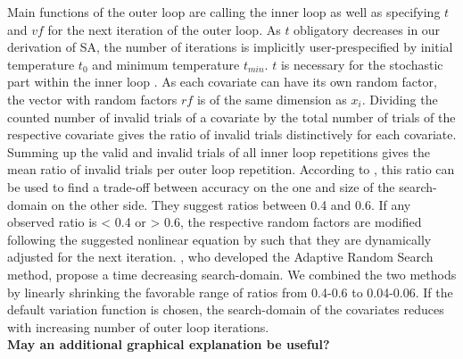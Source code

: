 Main functions of the outer loop are calling the inner loop as well as specifying $t$ and $vf$ for the next iteration of the outer loop. As $t$ obligatory decreases in our derivation of SA, the number of iterations is implicitly user-prespecified by initial temperature $t_0$ and minimum temperature $t_{min}$. $t$ is necessary for the stochastic part within the inner loop \citep{kirkpatrick_1983}. As each covariate can have its own random factor, the vector with random factors $rf$ is of the same dimension as $x_i$. Dividing the counted number of invalid trials of a covariate by the total number of trials of the respective covariate gives the ratio of invalid trials distinctively for each covariate. Summing up the valid and invalid trials of all inner loop repetitions gives the mean ratio of invalid trials per outer loop repetition. According to \citep{corana_1987}, this ratio can be used to find a trade-off between accuracy on the one and size of the search-domain on the other side. They suggest ratios between 0.4 and 0.6. If any observed ratio is < 0.4 or > 0.6, the respective random factors are modified following the suggested nonlinear equation by \citet{corana_1987} such that they are dynamically adjusted for the next iteration. \citet{pronzato_1984}, who developed the Adaptive Random Search method, propose a time decreasing search-domain. We combined the two methods by linearly shrinking the favorable range of ratios from 0.4-0.6 to 0.04-0.06. If the default variation function is chosen, the search-domain of the covariates reduces with increasing number of outer loop iterations.\\

\textbf{May an additional graphical explanation be useful?}

